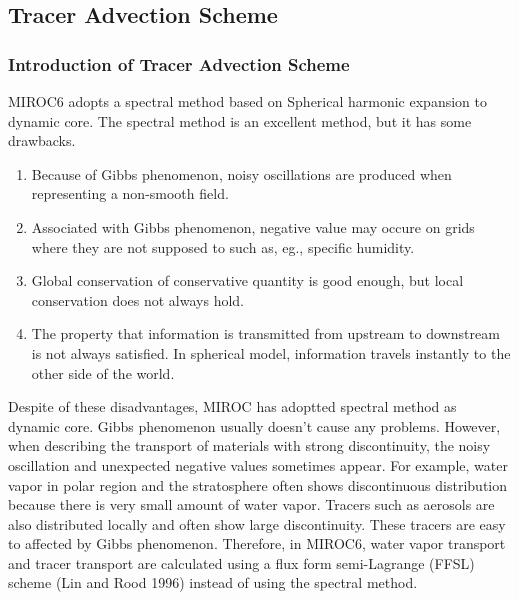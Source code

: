%
\subsection{Tracer Advection Scheme}
\subsubsection{Introduction of Tracer Advection Scheme}
MIROC6 adopts a spectral method based on Spherical harmonic expansion to dynamic core.
The spectral method is an excellent method, but it has some drawbacks.
\begin{enumerate}
\item Because of Gibbs phenomenon, noisy oscillations are produced when representing a non-smooth field.
\item Associated with Gibbs phenomenon, negative value may occure on grids where they are not supposed to such as, eg., specific humidity.
\item Global conservation of conservative quantity is good enough, but local conservation does not always hold.
\item The property that information is transmitted from upstream to downstream is not always satisfied. In spherical model, information travels instantly to the other side of the world.
\end{enumerate}
Despite of these disadvantages, MIROC has adoptted spectral method as dynamic core.
Gibbs phenomenon usually doesn't cause any problems.
However, when describing the transport of materials with strong discontinuity, the noisy oscillation and unexpected negative values sometimes appear.
For example, water vapor in polar region and the stratosphere often shows discontinuous distribution because there is very small amount of water vapor.
Tracers such as aerosols are also distributed locally and often show large discontinuity.
These tracers are easy to affected by Gibbs phenomenon.
Therefore, in MIROC6, water vapor transport and tracer transport are calculated using a flux form semi-Lagrange (FFSL) scheme (Lin and Rood 1996) instead of using the spectral method.

